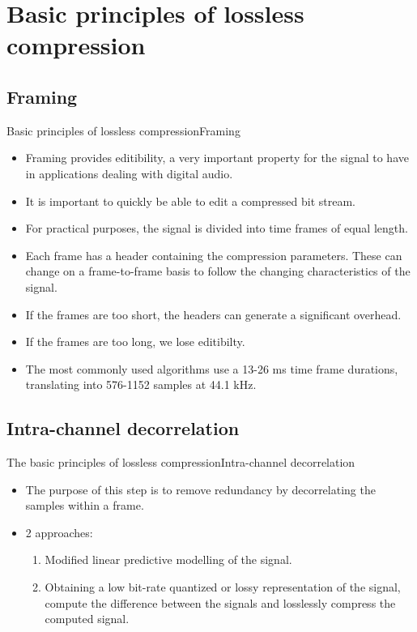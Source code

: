 \documentclass{beamer}
\begin{document}
\section{ Basic principles of lossless compression}
\subsection{Framing}
\begin{frame}{Basic principles of lossless compression}{Framing}
	\begin{itemize}[<+->]
		\item{
			Framing provides editibility, a very important property for the signal to have in applications dealing with digital audio.
		}
		\item{
			It is important to quickly be able to edit a compressed bit stream.
		}
		\item{
			For practical purposes, the signal is divided into time frames of equal length.
		}
		\item{
			Each frame has a header containing the compression parameters. These can change on a frame-to-frame basis to follow the changing characteristics of the signal.
		}
		\item{
			If the frames are too short, the headers can generate a significant overhead.
		}
		\item{
			If the frames are too long, we lose editibilty.
		}
		\item{
			The most commonly used algorithms use a 13-26 ms time frame durations, translating into 576-1152 samples at 44.1 kHz.
		}
	\end{itemize}
\end{frame}

\subsection{Intra-channel decorrelation}
\begin{frame}{The basic principles of lossless compression}{Intra-channel decorrelation}
	\begin{itemize}[<+->]
		\item{
			The purpose of this step is to remove redundancy by decorrelating the samples within a frame.
		}
		\item{
			2 approaches:
		}
		\begin{enumerate}
			\item{
				Modified linear predictive modelling of the signal.
			}
			\item{
				Obtaining a low bit-rate quantized or lossy representation of the signal, compute the difference between the signals and losslessly compress the computed signal.
			}
		\end{enumerate}
	\end{itemize}
\end{frame}
\end{document}
